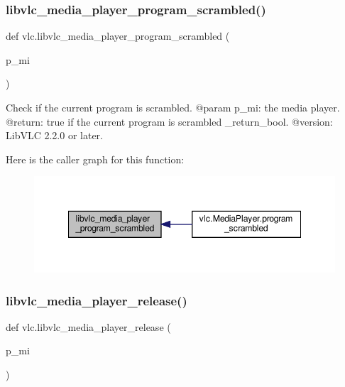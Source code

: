 \subsubsection{\texorpdfstring{libvlc\+\_\+media\+\_\+player\+\_\+program\+\_\+scrambled()}{libvlc\_media\_player\_program\_scrambled()}}
{\footnotesize\ttfamily def vlc.\+libvlc\+\_\+media\+\_\+player\+\_\+program\+\_\+scrambled (\begin{DoxyParamCaption}\item[{}]{p\+\_\+mi }\end{DoxyParamCaption})}

\begin{DoxyVerb}Check if the current program is scrambled.
@param p_mi: the media player.
@return: true if the current program is scrambled \libvlc_return_bool.
@version: LibVLC 2.2.0 or later.
\end{DoxyVerb}
 Here is the caller graph for this function\+:
\nopagebreak
\begin{figure}[H]
\begin{center}
\leavevmode
\includegraphics[width=348pt]{namespacevlc_a17e9b0dc6a8244a4c018d79adb86095a_icgraph}
\end{center}
\end{figure}
\mbox{\label{namespacevlc_a81e3d692fb602bd1b936420d32fd5cff}} 
\subsubsection{\texorpdfstring{libvlc\+\_\+media\+\_\+player\+\_\+release()}{libvlc\_media\_player\_release()}}
{\footnotesize\ttfamily def vlc.\+libvlc\+\_\+media\+\_\+player\+\_\+release (\begin{DoxyParamCaption}\item[{}]{p\+\_\+mi }\end{DoxyParamCaption})}

